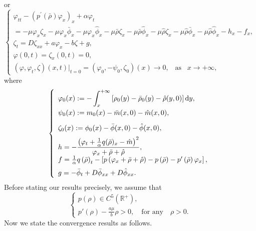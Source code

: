 \documentclass[11pt]{article}
\theoremstyle{plain}
\numberwithin{equation}{section}
\begin{document}
	or
	\begin{equation}\label{20}
		\left\{
		\begin{array}{lr}
			\varphi_{tt}-\left(p^{\prime}(\bar\rho)\varphi_x\right)_x	+\alpha \varphi_t\\[2mm]
			=-\mu \varphi_x\zeta_x-\mu \varphi_x\bar\phi_x-\mu \varphi_x\hat\phi_x-\mu\bar\rho\zeta_x-\mu\bar\rho\hat\phi_x-\mu\hat\rho\zeta_x-\mu\hat\rho\bar\phi_x-\mu\hat\rho\hat\phi_x-h_x-f_x,\\[2mm]
			\zeta_t=D\zeta_{xx}+a\varphi_x-b\zeta+g,\\[2mm]
			\varphi(0,t)=\zeta_x(0,t)=0,\\[2mm]
			\left(\varphi,\varphi_t,\zeta\right)(x,t)|_{t=0}=(\varphi_0,-\psi_0,\zeta_0)(x)\to0,\;\;\;\mbox{as}\;\;\; x\to+\infty,
		\end{array}
		\right.
	\end{equation}
	where
	\begin{equation}\label{22}
		\left\{
		\begin{array}{lr}
		\varphi_0(x):= -\displaystyle\int^{+\infty}_{x} \left[\rho_{0}(y)-\bar{\rho}_0(y)-\hat{\rho}(y,0) \right] {\rm d}y,\\[3mm]
\psi_0(x):=m_0(x)-\bar{m}(x,0)-\hat{m}(x,0),\\[3mm]
\zeta_0(x):=\phi_0(x)-\bar{\phi}(x,0)-\hat{\phi}(x,0),\\[2mm]
			h=-\displaystyle\frac{\left(\varphi_t+\frac{1}{\alpha}q(\bar\rho)_x-\hat m\right)^2}{\varphi_x+\bar\rho+\hat\rho},\\[2mm]
			f=\frac{1}{\alpha}q\left(\bar\rho\right)_t-\left[p\left(\varphi_x+\bar\rho+\hat\rho\right)-p\left(\bar\rho\right)-p^{\prime}\left(\bar\rho\right)\varphi_x\right],\\[2mm]
			g=-\bar\phi_t+D\bar\phi_{xx}+D\hat\phi_{xx}.
		\end{array}
		\right.
	\end{equation}
	Before stating our results precisely, we assume that 
	\begin{equation}\label{23}
		\left\{
		\begin{array}{lr}
			p(\rho)\in C^5(\mathbb{R}^{+}),\\[2mm]
			p'(\rho) - \frac{a\mu}{b}\rho > 0, \quad \text{for any} \quad \rho > 0.
		\end{array}
		\right.
	\end{equation}
	Now we state the convergence results as follows.
\end{document}
